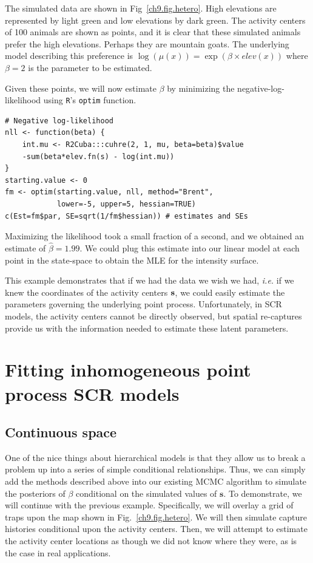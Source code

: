 The simulated data are shown in Fig~\ref{ch9.fig.hetero}. High elevations
are represented by light green and low elevations by dark green. The
activity centers of 100 animals are shown as
points, and it is clear that these simulated animals prefer the high
elevations.  Perhaps they are mountain goats. The underlying model describing this preference is
$\log(\mu(x)) = \exp(\beta \times elev(x))$
where $\beta=2$ is the parameter to be estimated.

Given these points, we will now estimate $\beta$ by minimizing the
negative-log-likelihood using \verb+R+'s \verb+optim+ function.

\begin{small}
\begin{verbatim}
# Negative log-likelihood
nll <- function(beta) {
    int.mu <- R2Cuba:::cuhre(2, 1, mu, beta=beta)$value
    -sum(beta*elev.fn(s) - log(int.mu))
}
starting.value <- 0
fm <- optim(starting.value, nll, method="Brent",
            lower=-5, upper=5, hessian=TRUE)
c(Est=fm$par, SE=sqrt(1/fm$hessian)) # estimates and SEs
\end{verbatim}
\end{small}


Maximizing the likelihood took a small fraction of a second, and we
obtained an estimate of $\hat{\beta}=1.99$. We could plug
this estimate into our linear model at each point in the state-space to
obtain the MLE for the intensity surface.

This example demonstrates
that if we had the data we wish we had, {\it i.e.} if we knew the
coordinates of the activity centers $\bf s$, we could easily estimate the
parameters governing the underlying point process. Unfortunately, in
SCR models, the activity centers cannot be directly observed, but
spatial re-captures provide us with the information needed to
estimate these latent parameters.

\section{Fitting inhomogeneous point process SCR models}

\subsection{Continuous space}

One of the nice things about hierarchical models is that they allow us
to break a problem up into a series of simple conditional
relationships. Thus,
we can simply add the methods described above into our existing MCMC
algorithm to simulate the posteriors of $\beta$ conditional on the
simulated values of $\mathbf{s}$. To demonstrate, we will continue with
the previous example. Specifically, we will overlay a grid of
traps upon the map shown in Fig.~\ref{ch9.fig.hetero}. We will then
simulate capture histories conditional upon the activity
centers. Then, we will attempt to estimate the activity center
locations as though we did not know where they were, as is the case in
real applications.

